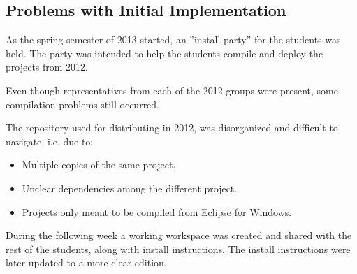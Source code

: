 \subsection*{Problems with Initial Implementation}
As the spring semester of 2013 started, an ''install party'' for the students was held. The party was intended to help the students compile and deploy the projects from 2012.

Even though representatives from each of the 2012 groups were present, some compilation problems still occurred.

The repository used for distributing in 2012, was disorganized and difficult to navigate, i.e. due to:
\begin{itemize}
  \item Multiple copies of the same project.
  \item Unclear dependencies among the different project.
  \item Projects only meant to be compiled from Eclipse for Windows.
\end{itemize}

During the following week a working workspace was created and shared with the rest of the students, along with install instructions. The install instructions were later updated to a more clear edition.
